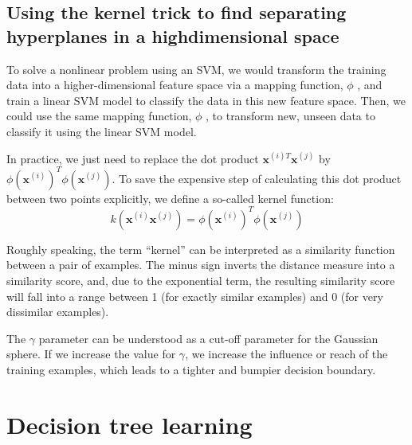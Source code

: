 \subsection{Using the kernel trick to find separating hyperplanes in a highdimensional space}
To solve a nonlinear problem using an SVM, we would transform the training data into a higher-dimensional feature space via a mapping function, $\phi$ , and train a linear SVM model to classify the data in this new feature space. Then, we could use the same mapping function, $\phi$ , to transform new, unseen data to classify it using the linear SVM model.

In practice, we just need to replace the dot product $\textbf{x}^{(i)T}\textbf{x}^{(j)}$ by $\phi(\textbf{x}^{(i)})^T\phi(\textbf{x}^{(j)})$. To save the expensive step of calculating this dot product between two points explicitly, we define a so-called kernel function:
$$k(\textbf{x}^{(i)}\textbf{x}^{(j)})=\phi(\textbf{x}^{(i)})^T\phi(\textbf{x}^{(j)})$$

Roughly speaking, the term “kernel” can be interpreted as a similarity function between a pair of examples. The minus sign inverts the distance measure into a similarity score, and, due to the exponential term, the resulting similarity score will fall into a range between 1 (for exactly similar examples) and 0 (for very dissimilar examples).

The $\gamma$ parameter can be understood as a cut-off parameter for the Gaussian sphere. If we increase the value for $\gamma$, we increase the influence or reach of the training examples, which leads to a tighter and bumpier decision boundary.

\section{Decision tree learning}